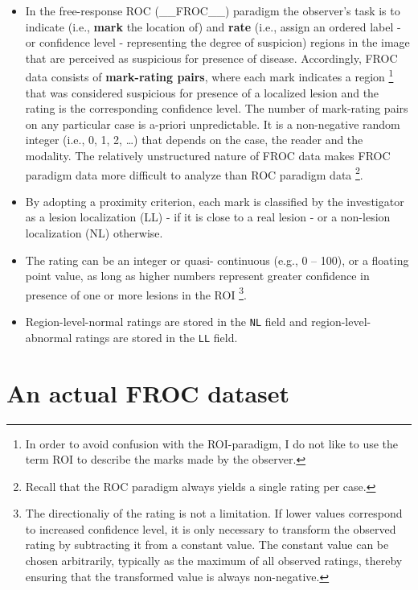 \documentclass[]{book}
\let\rmarkdownfootnote\footnote%
\def\footnote{\protect\rmarkdownfootnote}
\begin{document}
\begin{itemize}
\item
  In the free-response ROC (\_\_FROC\_\_) paradigm \citep{RN85} the observer's task is to indicate (i.e., \textbf{mark} the location of) and \textbf{rate} (i.e., assign an ordered label - or confidence level - representing the degree of suspicion) regions in the image that are perceived as suspicious for presence of disease. Accordingly, FROC data consists of \textbf{mark-rating pairs}, where each mark indicates a region \footnote{In order to avoid confusion with the ROI-paradigm, I do not like to use the term ROI to describe the marks made by the observer.} that was considered suspicious for presence of a localized lesion and the rating is the corresponding confidence level. The number of mark-rating pairs on any particular case is a-priori unpredictable. It is a non-negative random integer (i.e., 0, 1, 2, \ldots{}) that depends on the case, the reader and the modality. The relatively unstructured nature of FROC data makes FROC paradigm data more difficult to analyze than ROC paradigm data \footnote{Recall that the ROC paradigm always yields a single rating per case.}.
\item
  By adopting a proximity criterion, each mark is classified by the investigator as a lesion localization (LL) - if it is close to a real lesion - or a non-lesion localization (NL) otherwise.
\item
  The rating can be an integer or quasi- continuous (e.g., 0 -- 100), or a floating point value, as long as higher numbers represent greater confidence in presence of one or more lesions in the ROI \footnote{The directionaliy of the rating is not a limitation. If lower values correspond to increased confidence level, it is only necessary to transform the observed rating by subtracting it from a constant value. The constant value can be chosen arbitrarily, typically as the maximum of all observed ratings, thereby ensuring that the transformed value is always non-negative.}.
\item
  Region-level-normal ratings are stored in the \texttt{NL} field and region-level-abnormal ratings are stored in the \texttt{LL} field.
\end{itemize}

\hypertarget{an-actual-froc-dataset}{%
\section{An actual FROC dataset}\label{an-actual-froc-dataset}}
\end{document}
